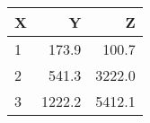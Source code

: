 \begin{tabular}{lrr}
\toprule
     X &          Y &         Z \\
\midrule
     1 &      173.9 &      100.7\\
     2 &      541.3 &     3222.0\\
     3 &     1222.2 &     5412.1\\
\bottomrule
\end{tabular}
